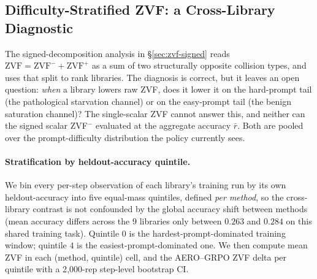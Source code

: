 
\subsection{Difficulty-Stratified ZVF: a Cross-Library Diagnostic}
\label{sec:zvf-stratified}

The signed-decomposition analysis in \S\ref{sec:zvf-signed} reads
$\mathrm{ZVF} = \mathrm{ZVF}^- + \mathrm{ZVF}^+$ as a sum of two
structurally opposite collision types, and uses that split to rank
libraries. The diagnosis is correct, but it leaves an open question:
\emph{when} a library lowers raw ZVF, does it lower it on the
hard-prompt tail (the pathological starvation channel) or on the
easy-prompt tail (the benign saturation channel)? The single-scalar
ZVF cannot answer this, and neither can the signed scalar ZVF$^-$
evaluated at the aggregate accuracy $\bar r$. Both are pooled over
the prompt-difficulty distribution the policy currently sees.

\paragraph{Stratification by heldout-accuracy quintile.}
We bin every per-step observation of each library's training run by
its own heldout-accuracy into five equal-mass quintiles, defined
\emph{per method}, so the cross-library contrast is not confounded by
the global accuracy shift between methods (mean accuracy differs
across the 9 libraries only between $0.263$ and $0.284$ on this
shared training task). Quintile $0$ is the hardest-prompt-dominated
training window; quintile $4$ is the easiest-prompt-dominated one.
We then compute mean ZVF in each (method, quintile) cell, and the
AERO--GRPO ZVF delta per quintile with a 2{,}000-rep step-level
bootstrap CI.

